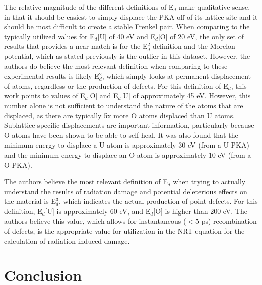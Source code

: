 \documentclass[review]{elsarticle}
\begin{document}
The relative magnitude of the different definitions of E$_d$ make qualitative sense, in that it should be easiest to simply displace the PKA off of its lattice site and it should be most difficult to create a stable Frenkel pair. When comparing to the typically utilized values for E$_d$[U] of 40 eV and E$_d$[O] of 20 eV, the only set of results that provides a near match is for the E$_d^2$ definition and the Morelon potential, which as stated previously is the outlier in this dataset. However, the authors do believe the most relevant definition when comparing to these experimental results is likely E$_d^2$, which simply looks at permanent displacement of atoms, regardless or the production of defects. For this definition of E$_d$, this work points to values of E$_d$[O] and E$_d$[U] of approximately 45 eV. However, this number alone is not sufficient to understand the nature of the atoms that are displaced, as there are typically 5x more O atoms displaced than U atoms. Sublattice-specific displacements are important information, particularly because O atoms have been shown to be able to self-heal. It was also found that the minimum energy to displace a U atom is approximately 30 eV (from a U PKA) and the minimum energy to displace an O atom is approximately 10 eV (from a O PKA).

The authors believe the most relevant definition of E$_d$ when trying to actually understand the results of radiation damage and potential deleterious effects on the material is E$_d^3$, which indicates the actual production of point defects. For this definition, E$_d$[U] is approximately 60 eV, and E$_d$[O] is higher than 200 eV. The authors believe this value, which allows for instantaneous ($<$5 ps) recombination of defects, is the appropriate value for utilization in the NRT equation for the calculation of radiation-induced damage.

\FloatBarrier

\section{Conclusion}
\hspace{5mm}
\end{document}
